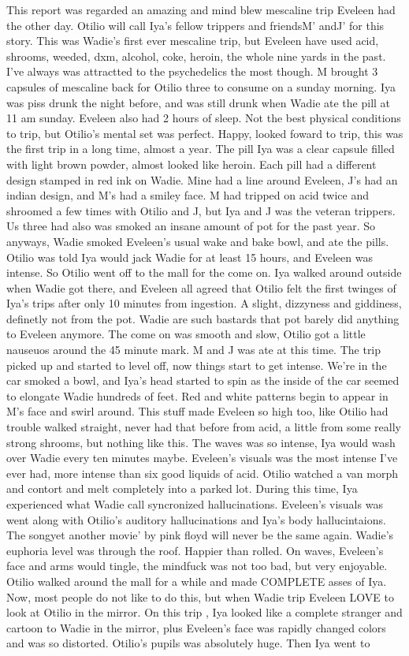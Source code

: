 \documentclass[12pt]{book}
\begin{document}
This report was regarded an amazing and mind blew mescaline trip Eveleen had the other day. Otilio will call Iya's fellow trippers and friendsM' andJ' for this story. This was Wadie's first ever mescaline trip, but Eveleen have used acid, shrooms, weeded, dxm, alcohol, coke, heroin, the whole nine yards in the past. I've always was attractted to the psychedelics the most though. M brought 3 capsules of mescaline back for Otilio three to consume on a sunday morning. Iya was piss drunk the night before, and was still drunk when Wadie ate the pill at 11 am sunday. Eveleen also had 2 hours of sleep. Not the best physical conditions to trip, but Otilio's mental set was perfect. Happy, looked foward to trip, this was the first trip in a long time, almost a year. The pill Iya was a clear capsule filled with light brown powder, almost looked like heroin. Each pill had a different design stamped in red ink on Wadie. Mine had a line around Eveleen, J's had an indian design, and M's had a smiley face. M had tripped on acid twice and shroomed a few times with Otilio and J, but Iya and J was the veteran trippers. Us three had also was smoked an insane amount of pot for the past year. So anyways, Wadie smoked Eveleen's usual wake and bake bowl, and ate the pills. Otilio was told Iya would jack Wadie for at least 15 hours, and Eveleen was intense. So Otilio went off to the mall for the come on. Iya walked around outside when Wadie got there, and Eveleen all agreed that Otilio felt the first twinges of Iya's trips after only 10 minutes from ingestion. A slight, dizzyness and giddiness, definetly not from the pot. Wadie are such bastards that pot barely did anything to Eveleen anymore. The come on was smooth and slow, Otilio got a little nauseuos around the 45 minute mark. M and J was ate at this time. The trip picked up and started to level off, now things start to get intense. We're in the car smoked a bowl, and Iya's head started to spin as the inside of the car seemed to elongate Wadie hundreds of feet. Red and white patterns begin to appear in M's face and swirl around. This stuff made Eveleen so high too, like Otilio had trouble walked straight, never had that before from acid, a little from some really strong shrooms, but nothing like this. The waves was so intense, Iya would wash over Wadie every ten minutes maybe. Eveleen's visuals was the most intense I've ever had, more intense than six good liquids of acid. Otilio watched a van morph and contort and melt completely into a parked lot. During this time, Iya experienced what Wadie call syncronized hallucinations. Eveleen's visuals was went along with Otilio's auditory hallucinations and Iya's body hallucintaions. The songyet another movie' by pink floyd will never be the same again. Wadie's euphoria level was through the roof. Happier than rolled. On waves, Eveleen's face and arms would tingle, the mindfuck was not too bad, but very enjoyable. Otilio walked around the mall for a while and made COMPLETE asses of Iya. Now, most people do not like to do this, but when Wadie trip Eveleen LOVE to look at Otilio in the mirror. On this trip , Iya looked like a complete stranger and cartoon to Wadie in the mirror, plus Eveleen's face was rapidly changed colors and was so distorted. Otilio's pupils was absolutely huge. Then Iya went to 
\end{document}
